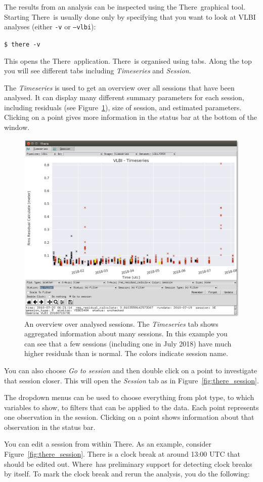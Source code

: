\documentclass[twocolumn,twoside]{svmultivs_gm} %
\newcommand{\code}[1]{{\footnotesize\texttt{#1}}}
\newcommand{\where}{\textsf{Where}}
\newcommand{\there}{\textsf{There}}
\begin{document}
The results from an analysis can be inspected using the \there\ graphical tool. Starting \there\ is usually done only by specifying that you want to look at VLBI analyses (either \code{-v} or \code{--vlbi}):

\code{\$ there -v}  

This opens the \there\ application. \there\ is organised using tabs. Along the top you will see different tabs including \emph{Timeseries} and \emph{Session}.

The \emph{Timeseries} is used to get an overview over all sessions that have been analysed. It can display many different summary parameters for each session, including residuals (see Figure~\ref{fig:there_timeseries}), size of session, and estimated parameters. Clicking on a point gives more information in the status bar at the bottom of the window.

\begin{figure}[t]
  \includegraphics[width=.5\textwidth]{hjelle03.png}
  \caption{An overview over analysed sessions. The \emph{Timeseries} tab shows aggregated information about many sessions. In this example you can see that a few sessions (including one in July 2018) have much higher residuals than is normal. The colors indicate session name.}
  \label{fig:there_timeseries}
\end{figure}

You can also choose \emph{Go to session} and then double click on a point to investigate that session closer. This will open the \emph{Session} tab as in Figure~\ref{fig:there_session}.

The dropdown menus can be used to choose everything from plot type, to which variables to show, to filters that can be applied to the data. Each point represents one observation in the session. Clicking on a point shows information about that observation in the status bar.

You can edit a session from within \there. As an example, consider Figure~\ref{fig:there_session}. There is a clock break at around 13:00 UTC that should be edited out. \where\ has preliminary support for detecting clock breaks by itself. To mark the clock break and rerun the analysis, you do the following:
\end{document}

